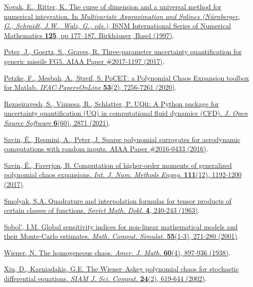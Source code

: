 \documentclass{eurosae}
\begin{document}
\begin{thebibliography}{99}
\href{\webDOI/10.1007/978-3-0348-8871-4_15}{Novak, E., Ritter, K. The curse of dimension and a universal method for numerical integration. In {\sl Multivariate Approximation and Splines (N\"{u}rnberger, G., Schmidt, J.W., Walz, G., eds.)}, ISNM International Series of Numerical Mathematics {\bf 125}, pp 177--187. Birkh\"{a}user, Basel (1997)}.

\href{\webDOI/10.2514/6.2017-1197}{Peter, J., Goertz, S., Graves, R. Three-parameter uncertainty quantification for generic missile FG5. AIAA Paper \#2017-1197 (2017)}.

\href{\webDOI/10.1016/j.ifacol.2020.12.560}{Petzke, F., Mesbah, A., Streif, S. PoCET: a Polynomial Chaos Expansion toolbox for Matlab. {\sl IFAC-PapersOnLine} {\bf 53}(2), 7256-7261 (2020)}.

\href{\webDOI/10.21105/joss.02871}{Rezaeiravesh, S., Vinuesa, R., Schlatter, P. UQit: A Python package for uncertainty quantification (UQ) in computational fluid dynamics (CFD). {\sl J. Open Source Software} {\bf 6}(60), 2871 (2021)}.

\href{\webDOI/10.2514/6.2016-0433}{Savin, \'E., Resmini, A., Peter, J. Sparse polynomial surrogates for aerodynamic computations with random inputs. AIAA Paper \#2016-0433 (2016)}.

\href{\webDOI/10.1002/nme.5505}{Savin, \'E., Faverjon, B. Computation of higher-order moments of generalized polynomial chaos expansions. {\sl Int. J. Num. Methods Engng.} {\bf 111}(12), 1192-1200 (2017)}.

\href{http://mi.mathnet.ru/eng/dan/v148/i5/p1042}{Smolyak, S.A. Quadrature and interpolation formulas for tensor products of certain classes of functions. {\sl Soviet Math. Dokl.} {\bf 4}, 240-243 (1963)}.

\href{\webDOI/10.1016/S0378-4754(00)00270-6}{Sobol', I.M. Global sensitivity indices for non-linear mathematical models and their Monte-Carlo estimates. {\sl Math. Comput. Simulat.} {\bf 55}(1-3), 271-280 (2001)}.

\href{\webDOI/10.2307/2371268}{Wiener, N. The homogeneous chaos. {\sl Amer. J. Math.} {\bf 60}(4), 897-936 (1938)}.

\href{\webDOI/10.1137/S1064827501387826}{Xiu, D., Karniadakis, G.E. The Wiener--Askey polynomial chaos for stochastic differential equations. {\sl SIAM J. Sci. Comput.} {\bf 24}(2), 619-644 (2002)}.

\end{thebibliography}



\end{document}
